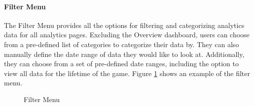 \paragraph{Filter Menu}

The Filter Menu provides all the options for filtering and categorizing analytics data for all analytics pages. Excluding the Overview dashboard, users can choose from a pre-defined list of categories to categorize their data by. They can also manually define the date range of data they would like to look at. Additionally, they can choose from a set of pre-defined date ranges, including the option to view all data for the lifetime of the game. Figure \ref{fig:filter_menu} shows an example of the filter menu. 

\begin{figure}[htb]
	\caption{\label{fig:filter_menu} Filter Menu}
\end{figure}
















	




















